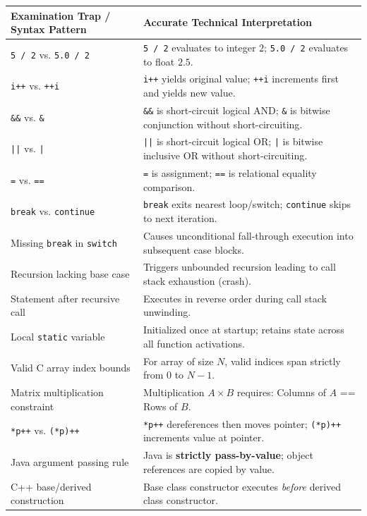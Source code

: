 \begin{table}[htbp]
\centering
\small
\begin{tabularx}{\textwidth}{l X}
\toprule
\textbf{Examination Trap / Syntax Pattern} & \textbf{Accurate Technical Interpretation} \\
\midrule
\texttt{5 / 2} vs. \texttt{5.0 / 2} & \texttt{5 / 2} evaluates to integer $2$; \texttt{5.0 / 2} evaluates to float $2.5$. \\
\texttt{i++} vs. \texttt{++i} & \texttt{i++} yields original value; \texttt{++i} increments first and yields new value. \\
\texttt{\&\&} vs. \texttt{\&} & \texttt{\&\&} is short-circuit logical AND; \texttt{\&} is bitwise conjunction without short-circuiting. \\
\texttt{||} vs. \texttt{|} & \texttt{||} is short-circuit logical OR; \texttt{|} is bitwise inclusive OR without short-circuiting. \\
\texttt{=} vs. \texttt{==} & \texttt{=} is assignment; \texttt{==} is relational equality comparison. \\
\texttt{break} vs. \texttt{continue} & \texttt{break} exits nearest loop/switch; \texttt{continue} skips to next iteration. \\
Missing \texttt{break} in \texttt{switch} & Causes unconditional fall-through execution into subsequent case blocks. \\
Recursion lacking base case & Triggers unbounded recursion leading to call stack exhaustion (crash). \\
Statement after recursive call & Executes in reverse order during call stack unwinding. \\
Local \texttt{static} variable & Initialized once at startup; retains state across all function activations. \\
Valid C array index bounds & For array of size $N$, valid indices span strictly from $0$ to $N-1$. \\
Matrix multiplication constraint & Multiplication $A \times B$ requires: Columns of $A$ == Rows of $B$. \\
\texttt{*p++} vs. \texttt{(*p)++} & \texttt{*p++} dereferences then moves pointer; \texttt{(*p)++} increments value at pointer. \\
Java argument passing rule & Java is \textbf{strictly pass-by-value}; object references are copied by value. \\
C++ base/derived construction & Base class constructor executes \textit{before} derived class constructor. \\

\end{tabularx}
\end{table}
